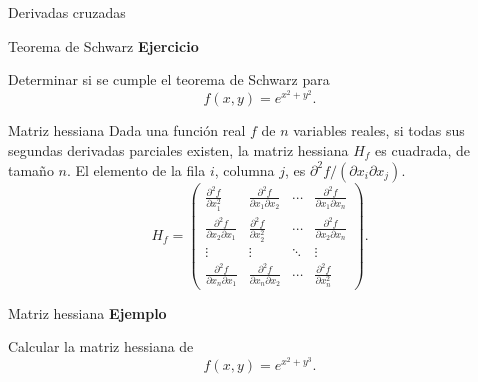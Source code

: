 \documentclass[main.tex]{subfiles}
\begin{document}
\begin{frame}{Derivadas cruzadas}
\begin{center}
\end{center}
\end{frame}
\begin{frame}{Teorema de Schwarz}
\textbf{Ejercicio}\par Determinar si se cumple el teorema de Schwarz para\[f(x,y)=e^{x^2+y^2}.\]
\end{frame}
\begin{frame}{Matriz hessiana}
\small Dada una función real $f$ de $n$ variables reales, si todas sus segundas derivadas parciales existen, la matriz hessiana $H_f$ es cuadrada, de tamaño $n$. El elemento de la fila $i$, columna $j$, es $\partial^2f/(\partial x_i\partial x_j)$.
\[H_f=\begin{pmatrix}
\frac{\partial^2f}{\partial x_1^2}&\frac{\partial^2f}{\partial x_1\partial x_2}&\cdots&\frac{\partial^2f}{\partial x_1\partial x_n}\\
\frac{\partial^2f}{\partial x_2\partial x_1}&\frac{\partial^2f}{\partial x_2^2}&\cdots&\frac{\partial^2f}{\partial x_2\partial x_n}\\
\vdots&\vdots&\ddots&\vdots\\
\frac{\partial^2f}{\partial x_n\partial x_1}&\frac{\partial^2f}{\partial x_n\partial x_2}&\cdots&\frac{\partial^2f}{\partial x_n^2}
\end{pmatrix}.\]
\end{frame}
\begin{frame}{Matriz hessiana}
\textbf{Ejemplo}\par Calcular la matriz hessiana de\[f(x,y)=e^{x^2+y^3}.\]
\end{frame}
\end{document}
